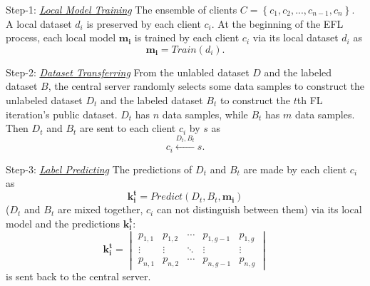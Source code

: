 \documentclass[journal]{IEEEtran}
\begin{document}
\par Step-1: \ul{\textit{Local Model Training}} The ensemble of clients $C=\left \{ c_{1},c_{2},...,c_{n-1},c_{n} \right \}$. A local dataset $d_i$ is preserved by each client $c_i$. At the beginning of the EFL process, each local model $\mathbf{m_i}$ is trained by each client $c_i$ via its local dataset $d_i$ as
\begin{equation}
  \mathbf{m_i}=Train(d_i).
\end{equation}
\par Step-2: \ul{\textit{Dataset Transferring}} From the unlabled dataset $D$ and the labeled dataset $B$, the central server randomly selects some data samples to construct the unlabeled dataset $D_t$ and the labeled dataset $B_t$ to construct the $t$th FL iteration's public dataset. $D_t$ has $n$ data samples, while $B_t$ has $m$ data samples. Then $D_t$ and $B_t$ are sent to each client $c_i$ by $s$ as
\begin{equation}
  c_{i} \overset{{D_{t},B_{t}}}{\leftarrow}s.
\end{equation}
\par Step-3: \ul{\textit{Label Predicting}} The predictions of $D_t$ and $B_t$ are made by each client $c_i$ as
\begin{equation}
  \mathbf{k_i^t}=Predict(D_t, B_t, \mathbf{m_i})
\end{equation}
($D_t$ and $B_t$ are mixed together, $c_i$ can not distinguish between them) via its local model and the predictions $\mathbf{k_i^t}$:
\begin{equation}
  \mathbf{k_i^t}=\begin{vmatrix}
    p_{1,1} & p_{1,2} & \cdots  & p_{1,g-1} & p_{1,g}\\ 
    \vdots  & \vdots & \ddots  & \vdots & \vdots\\ 
    p_{n,1} & p_{n,2} & \cdots  & p_{n,g-1} & p_{n,g}
    \end{vmatrix}
\end{equation}
is sent back to the central server.
\end{document}
